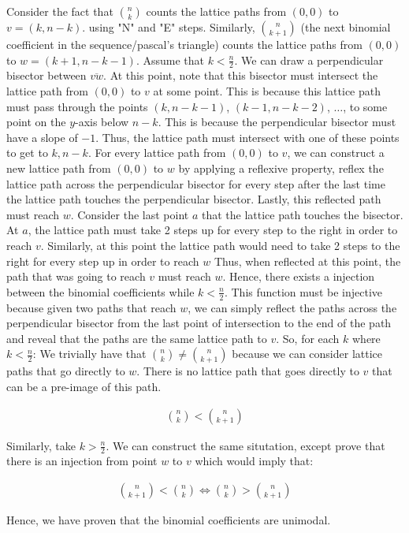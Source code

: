 \documentclass{report}
\begin{document}
\begin{subproof}
    Consider the fact that $\binom{n}{k}$ counts the lattice paths from $(0,0)$ to $v=(k,n-k)$. using
    "N" and "E" steps. Similarly, $\binom{n}{k+1}$ (the next binomial coefficient in the sequence/pascal's
    triangle) counts the lattice paths from $(0,0)$ to $w=(k+1,n-k-1)$. Assume that $k < \frac{n}{2}$. We can
    draw a perpendicular bisector between $\overline{vw}$. At this point, note that this bisector must
    intersect the lattice path from $(0,0)$ to $v$ at some point. This is because this lattice path
    must pass through the points $(k, n-k-1)$, $(k-1,n-k-2)$, $\dots$, to some point on the $y$-axis below $n-k$.
    This is because the perpendicular bisector must have a slope of $-1$. Thus, the lattice path must intersect
    with one of these points to get to $k,n-k$. For every lattice path from $(0,0)$ to $v$,
    we can construct a new lattice path from $(0,0)$ to $w$ by applying a reflexive property, reflex
    the lattice path across the perpendicular bisector for every step after the last time the lattice path touches
    the perpendicular bisector. Lastly, this reflected path must reach $w$. Consider the last point $a$ that the
    lattice path touches the bisector. At $a$, the lattice path must take 2 steps up for every step to the right
    in order to reach $v$. Similarly, at this point the lattice path would need to take 2 steps to the right
    for every step up in order to reach $w$ Thus, when reflected at this point, the path that was going to
    reach $v$ must reach $w$. Hence, there exists a injection between the binomial coefficients while
    $k < \frac{n}{2}$. This function must be injective because given two paths that reach
    $w$, we can simply reflect the paths across the perpendicular bisector from the last point of intersection
    to the end of the path and reveal that the paths are the same lattice path to $v$.
    So, for each $k$ where $k < \frac{n}{2}$: We trivially have that $\binom{n}{k} \ne \binom{n}{k+1}$ because
    we can consider lattice paths that go directly to $w$. There is no lattice
    path that goes directly to $v$ that can be a pre-image of this path.

    \begin{align*}
        \binom{n}{k} < \binom{n}{k+1}
    \end{align*}

    \noindent
    Similarly, take $k > \frac{n}{2}$. We can construct the same situtation, except prove that there is an injection
    from point $w$ to $v$ which would imply that:

    \begin{align*}
        \binom{n}{k+1} < \binom{n}{k} \iff \binom{n}{k} > \binom{n}{k+1}
    \end{align*}

    Hence, we have proven that the binomial coefficients are unimodal.
\end{subproof}
\end{document}
